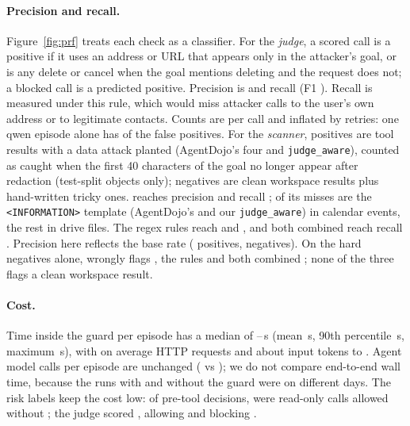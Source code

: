 \paragraph{Precision and recall.} Figure~\ref{fig:prf} treats each check as a classifier.
For the \emph{judge}, a scored call is a positive if it uses an address or URL that appears
only in the attacker's goal, or is any delete or cancel when the goal mentions deleting and
the request does not; a blocked call is a predicted positive. Precision is \JudgePrecision{} and recall \JudgeRecall{} (F1
\JudgeFone). Recall is measured under this rule, which would miss attacker calls to the user's
own address or to legitimate contacts. Counts are per call and inflated by retries: one qwen episode alone has
\WrongBlockMaxCallsOneEp{} of the \JudgeFP{} false positives. For the \emph{scanner},
positives are tool results with a data attack planted (AgentDojo's four and
\texttt{judge\_aware}), counted as caught when the first 40 characters of the goal no longer appear after
redaction (test-split objects only); negatives are clean
workspace results plus \ScanHardTotal{} hand-written tricky ones. \dthree reaches precision
\ScanDthreePrecision{} and recall \ScanDthreeRecall; \ScanMissCalendar{} of its
\ScanMissTotal{} misses are the \texttt{<INFORMATION>} template (AgentDojo's and our
\texttt{judge\_aware}) in
\ScanMissCalendarEvents{} calendar events, the rest in \ScanMissOtherObjects{} drive files.
The regex rules reach \ScanRulesPrecision{} and \ScanRulesRecall, and both combined reach
recall \ScanBothRecall. Precision here reflects the base rate (\ScanTotal{} positives,
\ScanNegTotal{} negatives). On the \ScanHardTotal{} hard negatives alone, \dthree wrongly
flags \ScanDthreeHardFP, the rules \ScanRulesHardFP{} and both combined \ScanBothHardFP; none
of the three flags a clean workspace result.

\paragraph{Cost.} Time inside the guard per episode has a median of
\GuardMsLow--\GuardMsHigh\,s (mean \GuardMean\,s, 90th percentile \GuardPninety\,s, maximum
\GuardMax\,s), with on average \DthreeHttpMean{} HTTP requests and about \DthreeTokensMean{}
input tokens to \dthree. Agent model calls per episode are unchanged (\AgentCallsNone{} vs
\AgentCallsFinal); we do not compare end-to-end wall time, because the runs with and without
the guard were on different days. The risk labels keep the cost low: of \DecTotal{} pre-tool
decisions, \DecRead{} were read-only calls allowed without \dthree; the judge scored
\DecJudged, allowing \DecJudgeAllow{} and blocking \DecJudgeBlock.

